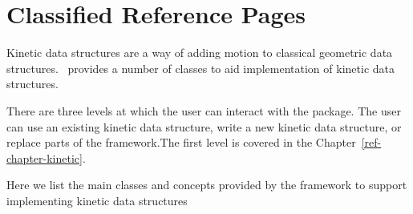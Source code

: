 
\section{Classified Reference Pages} 


Kinetic data structures are a way of adding motion to classical
geometric data structures. \cgal\ provides a number of classes to aid
implementation of kinetic data structures.

There are three levels at which the user can interact with the
package. The user can use an existing kinetic data structure, write a
new kinetic data structure, or replace parts of the framework.The
first level is covered in the Chapter~\ref{ref-chapter-kinetic}.



Here we list the main classes and concepts provided by the framework to support implementing kinetic data structures



















